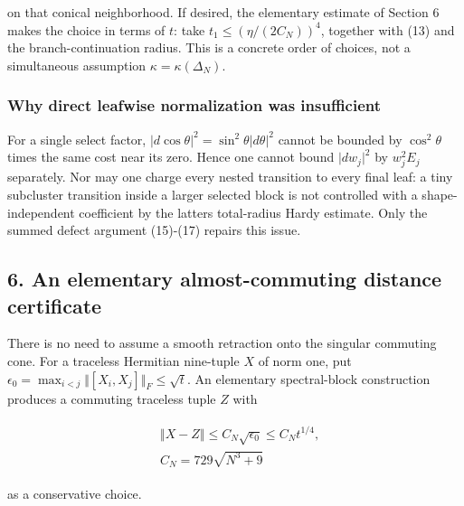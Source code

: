 on that conical neighborhood. If desired, the elementary estimate of
Section \(6\) makes the choice in terms of \(t\): take
\(t_{1}\le (\eta /(2 C_{N}))^{4}\), together with (13) and the
branch-continuation radius. This is a concrete order of choices, not a
simultaneous assumption \(\kappa =\kappa (\Delta _{N})\).

\subsubsection{Why direct leafwise normalization was
insufficient}\label{j-why-direct-leafwise-normalization-was-insufficient}

For a single select factor,
\(\vert d \cos  \theta \vert ^{2}=\sin ^{2} \theta  \vert d \theta \vert ^{2}\)
cannot be bounded by \(\cos ^{2} \theta\) times the same cost near its
zero. Hence one cannot bound \(\vert dw_{j}\vert ^{2}\) by
\(w_{j}^{2} E_{j}\) separately. Nor may one charge every nested
transition to every final leaf: a tiny subcluster transition inside a
larger selected block is not controlled with a shape-independent
coefficient by the latter\textquotesingle s total-radius Hardy estimate.
Only the summed defect argument (15)-(17) repairs this issue.

\subsection{6. An elementary almost-commuting distance
certificate}\label{j-an-elementary-almost-commuting-distance-certificate}

There is no need to assume a smooth retraction onto the singular
commuting cone. For a traceless Hermitian nine-tuple \(X\) of norm one,
put
\(\epsilon _{0}=\max _{i<j}\Vert [X_{i},X_{j}]\Vert _{F}\le \sqrt{t}\).
An elementary spectral-block construction produces a commuting traceless
tuple \(Z\) with

\begin{gather*}
\begin{aligned}
& \Vert X-Z\Vert  \le  C_{N} \sqrt{\epsilon _{0}} \le  C_{N} t^{1/4}, \\
& C_{N}=729 \sqrt{N^{3}+9}
\end{aligned}\tag{18}
\end{gather*}

as a conservative choice.

